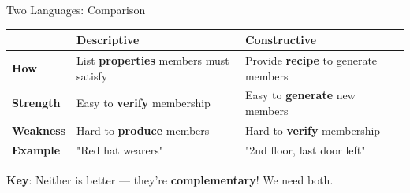 \documentclass[10pt]{beamer}
\theoremstyle{definition}
\newcommand{\x}[1]{\alert{\textbf{#1}}}
\begin{document}
\begin{frame}{Two Languages: Comparison}
\begin{center}
\begin{tabular}{|l|p{3.5cm}|p{3.5cm}|}
\hline
& \textbf{Descriptive} & \textbf{Constructive} \\
\hline
\textbf{How} & List \x{properties} members must satisfy & Provide \x{recipe} to generate members \\
\hline
\textbf{Strength} & Easy to \x{verify} membership & Easy to \x{generate} new members \\
\hline
\textbf{Weakness} & Hard to \x{produce} members & Hard to \x{verify} membership \\
\hline
\textbf{Example} & "Red hat wearers" & "2nd floor, last door left" \\
\hline
\end{tabular}
\end{center}

\vfill
\x{Key}: Neither is better — they're \x{complementary}! We need both.
\end{frame}
\end{document}
